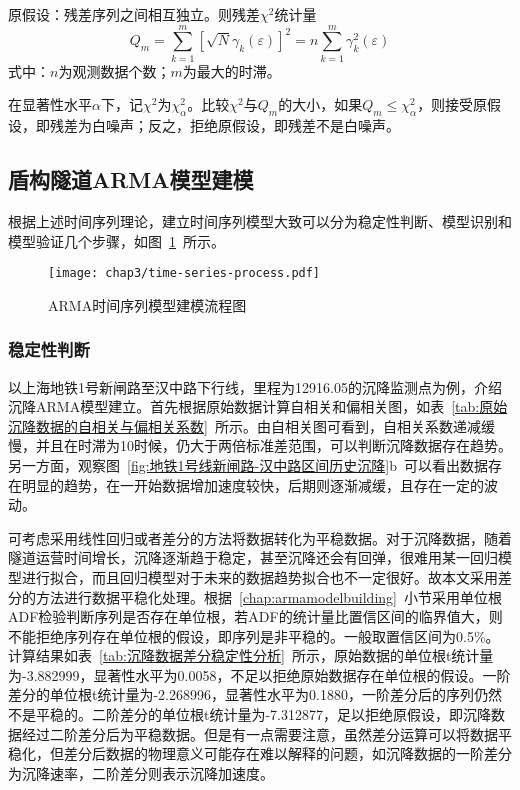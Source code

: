 原假设：残差序列之间相互独立。则残差${{\chi }^{2}}$统计量
\begin{equation}
	{{Q}_{m}}=\sum\limits_{k=1}^{m}{{{\left[ \sqrt{N}{{\gamma }_{k}}(\varepsilon ) \right]}^{2}}=n\sum\limits_{k=1}^{m}{\gamma _{k}^{2}(\varepsilon )}}
\end{equation}
式中：$n$为观测数据个数；$m$为最大的时滞。

在显著性水平$\alpha $下，记${{\chi }^{2}}$为$\chi _{\alpha }^{2}$。比较${{\chi }^{2}}$与$Q_m$的大小，如果${{Q}_{m}}\le \chi _{\alpha }^{2}$，则接受原假设，即残差为白噪声；反之，拒绝原假设，即残差不是白噪声。


\subsection{盾构隧道ARMA模型建模}
\label{chap:armatunnel}

根据上述时间序列理论，建立时间序列模型大致可以分为稳定性判断、模型识别和模型验证几个步骤，如图~\ref{fig:ARMA时间序列模型建模流程图}~所示。

\begin{figure}[htb!]
    \centering
    \texttt{[image: chap3/time-series-process.pdf]}
    \caption{ARMA时间序列模型建模流程图}
    \label{fig:ARMA时间序列模型建模流程图}
\end{figure}

\subsubsection{稳定性判断}

以上海地铁1号新闸路至汉中路下行线，里程为12916.05的沉降监测点为例，介绍沉降ARMA模型建立。首先根据原始数据计算自相关和偏相关图，如表~\ref{tab:原始沉降数据的自相关与偏相关系数}~所示。由自相关图可看到，自相关系数递减缓慢，并且在时滞为10时候，仍大于两倍标准差范围，可以判断沉降数据存在趋势。另一方面，观察图~\ref{fig:地铁1号线新闸路-汉中路区间历史沉降}b~可以看出数据存在明显的趋势，在一开始数据增加速度较快，后期则逐渐减缓，且存在一定的波动。

可考虑采用线性回归或者差分的方法将数据转化为平稳数据。对于沉降数据，随着隧道运营时间增长，沉降逐渐趋于稳定，甚至沉降还会有回弹，很难用某一回归模型进行拟合，而且回归模型对于未来的数据趋势拟合也不一定很好。故本文采用差分的方法进行数据平稳化处理。根据~\ref{chap:armamodelbuilding}~小节采用单位根ADF检验判断序列是否存在单位根，若ADF的统计量比置信区间的临界值大，则不能拒绝序列存在单位根的假设，即序列是非平稳的。一般取置信区间为0.5\%。计算结果如表~\ref{tab:沉降数据差分稳定性分析}~所示，原始数据的单位根t统计量为-3.882999，显著性水平为0.0058，不足以拒绝原始数据存在单位根的假设。一阶差分的单位根t统计量为-2.268996，显著性水平为0.1880，一阶差分后的序列仍然不是平稳的。二阶差分的单位根t统计量为-7.312877，足以拒绝原假设，即沉降数据经过二阶差分后为平稳数据。但是有一点需要注意，虽然差分运算可以将数据平稳化，但差分后数据的物理意义可能存在难以解释的问题，如沉降数据的一阶差分为沉降速率，二阶差分则表示沉降加速度。

